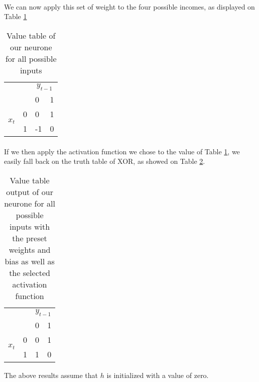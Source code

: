 \paragraph{}
We can now apply this set of weight to the four possible incomes, as displayed on Table \ref{neuroneValue}

\begin{table}
    \begin{center}
        \begin{tabular}{ll|ll}
            & \multicolumn{1}{c}{}  & \multicolumn{2}{c}{$y_{t-1}$} \\
            &   & 0 & 1 \\ \cline{2-4}
            \multirow{2}{*}{$x_t$}
            & 0 & 0  & 1 \\
            & 1 & -1 & 0 \\
        \end{tabular}
        \caption{Value table of our neurone for all possible inputs}
        \label{neuroneValue}
    \end{center}
\end{table}
\paragraph{}
If we then apply the activation function we chose to the value of Table \ref{neuroneValue}, we easily fall back on the truth table of XOR, as showed on Table \ref{neuroneValueFinal}.

\begin{table}
    \begin{center}
        \begin{tabular}{ll|ll}
            & \multicolumn{1}{c}{}  & \multicolumn{2}{c}{$y_{t-1}$} \\
            &   & 0 & 1 \\ \cline{2-4}
            \multirow{2}{*}{$x_t$}
            & 0 & 0 & 1 \\
            & 1 & 1 & 0 \\
        \end{tabular}
        \caption{Value table output of our neurone for all possible inputs with the preset weights and bias as well as the selected activation function}
        \label{neuroneValueFinal}
    \end{center}
\end{table}

The above results assume that $h$ is initialized with a value of zero.
